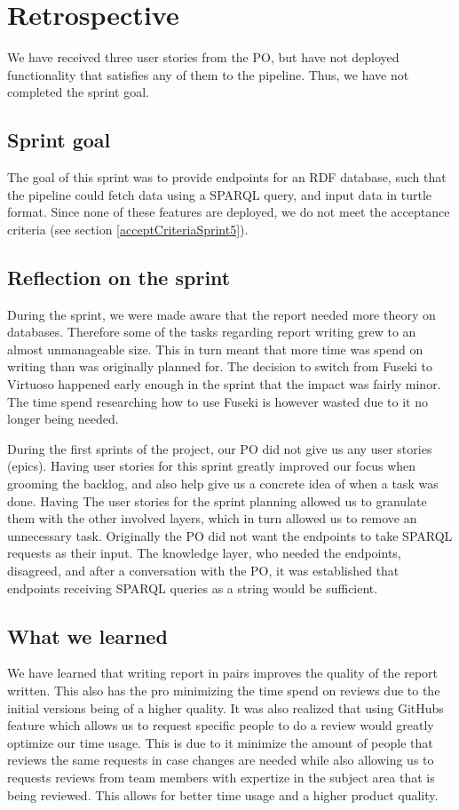 \section{Retrospective}
We have received three user stories from the PO, but have not deployed functionality that satisfies any of them to the \knox{} pipeline. Thus, we have not completed the sprint goal.

\subsection{Sprint goal}
The goal of this sprint was to provide endpoints for an RDF database, such that the \knox{} pipeline could fetch data using a SPARQL query, and input data in turtle format.
Since none of these features are deployed, we do not meet the acceptance criteria (see section \ref{acceptCriteriaSprint5}).

\subsection{Reflection on the sprint}
During the sprint, we were made aware that the report needed more theory on databases. 
Therefore some of the tasks regarding report writing grew to an almost unmanageable size. This in turn meant that more time was spend on writing than was originally planned for.
The decision to switch from Fuseki to Virtuoso happened early enough in the sprint that the impact was fairly minor. The time spend researching how to use Fuseki is however wasted due to it no longer being needed.

During the first sprints of the project, our PO did not give us any user stories (epics). Having user stories for this sprint greatly improved our focus when grooming the backlog, and also help give us a concrete idea of when a task was done. 
Having The user stories for the sprint planning allowed us to granulate them with the other involved layers, which in turn allowed us to remove an unnecessary task. Originally the PO did not want the endpoints to take SPARQL requests as their input.
The knowledge layer, who needed the endpoints, disagreed, and after a conversation with the PO, it was established that endpoints receiving SPARQL queries as a string would be sufficient.

\subsection{What we learned}
We have learned that writing report in pairs improves the quality of the report written. This also has the pro minimizing the time spend on reviews due to the initial versions being of a higher quality.
It was also realized that using GitHubs feature which allows us to request specific people to do a review would greatly optimize our time usage. This is due to it minimize the amount of people that reviews the same requests in case changes are needed while also allowing us to requests reviews from team members with expertize in the subject area that is being reviewed. This allows for better time usage and a higher product quality. 

